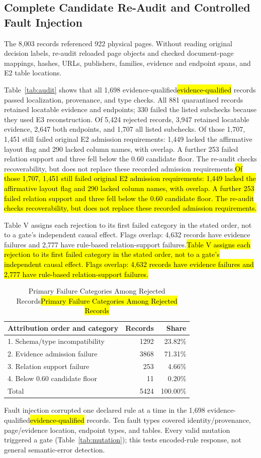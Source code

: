 \documentclass[conference,a4paper]{IEEEtran}
\DeclareRobustCommand{\rev}[1]{\ifdefined\CleanVersion#1\else\hl{#1}\fi}
\newcommand{\revtable}{\ifdefined\CleanVersion\else\rowcolors{1}{yellow!25}{yellow!25}\fi}
\begin{document}
\subsection{Complete Candidate Re-Audit and Controlled Fault Injection}

The 8,003 records referenced 922 physical pages. Without reading original decision labels, re-audit reloaded page objects and checked document-page mappings, hashes, URLs, publishers, families, evidence and endpoint spans, and E2 table locations.

Table~\ref{tab:audit} shows that all 1,698 \rev{evidence-qualified} records passed localization, provenance, and type checks. All 881 quarantined records retained locatable evidence and endpoints; 330 failed the listed subchecks because they used E3 reconstruction. Of 5,424 rejected records, 3,947 retained locatable evidence, 2,647 both endpoints, and 1,707 all listed subchecks. \rev{Of those 1,707, 1,451 still failed original E2 admission requirements: 1,449 lacked the affirmative layout flag and 290 lacked column names, with overlap. A further 253 failed relation support and three fell below the 0.60 candidate floor. The re-audit checks recoverability, but does not replace these recorded admission requirements.}

\rev{Table V assigns each rejection to its first failed category in the stated order, not to a gate's independent causal effect. Flags overlap: 4,632 records have evidence failures and 2,777 have rule-based relation-support failures.}

\begin{table}[t]
\caption{\rev{Primary Failure Categories Among Rejected Records}}
\label{tab:rejections}
\centering\footnotesize
\revtable
\begin{tabular}{lrr}
\toprule
Attribution order and category & Records & Share \\
\midrule
1. Schema/type incompatibility & 1292 & 23.82\% \\
2. Evidence admission failure & 3868 & 71.31\% \\
3. Relation support failure & 253 & 4.66\% \\
4. Below 0.60 candidate floor & 11 & 0.20\% \\
\midrule
Total & 5424 & 100.00\% \\
\bottomrule
\end{tabular}
\end{table}

Fault injection corrupted one declared rule at a time in the 1,698 \rev{evidence-qualified} records. Ten fault types covered identity/provenance, page/evidence location, endpoint types, and tables. Every valid mutation triggered a gate (Table~\ref{tab:mutation}); this tests encoded-rule response, not general semantic-error detection.
\end{document}
